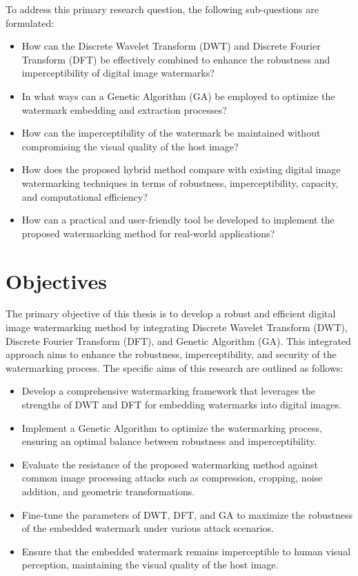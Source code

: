 To address this primary research question, the following sub-questions are formulated:

\begin{itemize}
    \item How can the Discrete Wavelet Transform (DWT) and Discrete Fourier Transform (DFT) be effectively combined to enhance the robustness and imperceptibility of digital image watermarks?
    \item In what ways can a Genetic Algorithm (GA) be employed to optimize the watermark embedding and extraction processes?
    \item How can the imperceptibility of the watermark be maintained without compromising the visual quality of the host image?
    \item How does the proposed hybrid method compare with existing digital image watermarking techniques in terms of robustness, imperceptibility, capacity, and computational efficiency?
    \item How can a practical and user-friendly tool be developed to implement the proposed watermarking method for real-world applications?
\end{itemize}

\section{Objectives}

The primary objective of this thesis is to develop a robust and efficient digital image watermarking method by integrating Discrete Wavelet Transform (DWT), Discrete Fourier Transform (DFT), and Genetic Algorithm (GA). This integrated approach aims to enhance the robustness, imperceptibility, and security of the watermarking process. The specific aims of this research are outlined as follows:

\begin{itemize}
    \item Develop a comprehensive watermarking framework that leverages the strengths of DWT and DFT for embedding watermarks into digital images.
    \item Implement a Genetic Algorithm to optimize the watermarking process, ensuring an optimal balance between robustness and imperceptibility.
    \item Evaluate the resistance of the proposed watermarking method against common image processing attacks such as compression, cropping, noise addition, and geometric transformations.
    \item Fine-tune the parameters of DWT, DFT, and GA to maximize the robustness of the embedded watermark under various attack scenarios.
    \item Ensure that the embedded watermark remains imperceptible to human visual perception, maintaining the visual quality of the host image.
\end{itemize}

